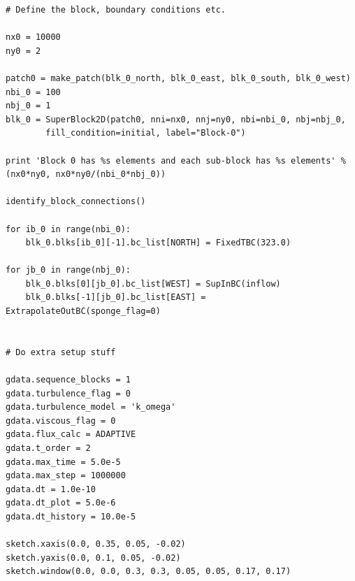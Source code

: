 {\begin{verbatim}
# Define the block, boundary conditions etc.

nx0 = 10000
ny0 = 2

patch0 = make_patch(blk_0_north, blk_0_east, blk_0_south, blk_0_west)
nbi_0 = 100
nbj_0 = 1
blk_0 = SuperBlock2D(patch0, nni=nx0, nnj=ny0, nbi=nbi_0, nbj=nbj_0,
		fill_condition=initial, label="Block-0")

print 'Block 0 has %s elements and each sub-block has %s elements' % (nx0*ny0, nx0*ny0/(nbi_0*nbj_0))

identify_block_connections()

for ib_0 in range(nbi_0):
    blk_0.blks[ib_0][-1].bc_list[NORTH] = FixedTBC(323.0)

for jb_0 in range(nbj_0):
    blk_0.blks[0][jb_0].bc_list[WEST] = SupInBC(inflow)
    blk_0.blks[-1][jb_0].bc_list[EAST] = ExtrapolateOutBC(sponge_flag=0)


# Do extra setup stuff

gdata.sequence_blocks = 1
gdata.turbulence_flag = 0
gdata.turbulence_model = 'k_omega'
gdata.viscous_flag = 0
gdata.flux_calc = ADAPTIVE
gdata.t_order = 2
gdata.max_time = 5.0e-5
gdata.max_step = 1000000
gdata.dt = 1.0e-10
gdata.dt_plot = 5.0e-6
gdata.dt_history = 10.0e-5

sketch.xaxis(0.0, 0.35, 0.05, -0.02)
sketch.yaxis(0.0, 0.1, 0.05, -0.02)
sketch.window(0.0, 0.0, 0.3, 0.3, 0.05, 0.05, 0.17, 0.17)
\end{verbatim}
}